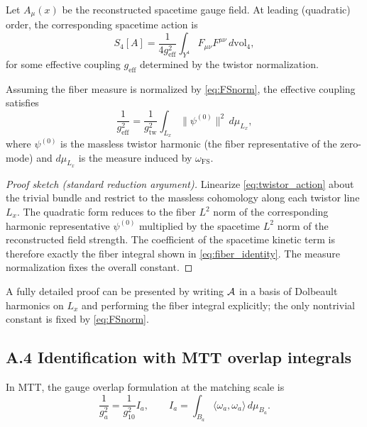 \documentclass[11pt]{article}
\begin{document}
Let $A_\mu(x)$ be the reconstructed spacetime gauge field.
At leading (quadratic) order, the corresponding spacetime action is
\begin{equation}
S_{4}[A]
=
\frac{1}{4g_{\mathrm{eff}}^2}
\int_{Y^4}
F_{\mu\nu}F^{\mu\nu}\,d\mathrm{vol}_4,
\label{eq:4d_action}
\end{equation}
for some effective coupling $g_{\mathrm{eff}}$ determined by the twistor normalization.

\begin{lemma}
Assuming the fiber measure is normalized by \eqref{eq:FSnorm},
the effective coupling satisfies
\begin{equation}
\frac{1}{g_{\mathrm{eff}}^2}
=
\frac{1}{g_{\mathrm{tw}}^2}
\int_{L_x}
\|\psi^{(0)}\|^2\, d\mu_{L_x},
\label{eq:fiber_identity}
\end{equation}
where $\psi^{(0)}$ is the massless twistor harmonic (the fiber representative of the
zero-mode) and $d\mu_{L_x}$ is the measure induced by $\omega_{\mathrm{FS}}$.
\end{lemma}

\begin{proof}[Proof sketch (standard reduction argument)]
Linearize \eqref{eq:twistor_action} about the trivial bundle and restrict to the
massless cohomology along each twistor line $L_x$.
The quadratic form reduces to the fiber $L^2$ norm of the corresponding harmonic
representative $\psi^{(0)}$ multiplied by the spacetime $L^2$ norm of the reconstructed
field strength. The coefficient of the spacetime kinetic term is therefore exactly the
fiber integral shown in \eqref{eq:fiber_identity}. The measure normalization fixes the
overall constant.
\end{proof}

\begin{remark}
A fully detailed proof can be presented by writing ${\cal A}$ in a basis of
Dolbeault harmonics on $L_x$ and performing the fiber integral explicitly;
the only nontrivial constant is fixed by \eqref{eq:FSnorm}.
\end{remark}

\subsection{A.4 Identification with MTT overlap integrals}

In MTT, the gauge overlap formulation at the matching scale is
\begin{equation}
\frac{1}{g_a^2} = \frac{1}{g_{10}^2} I_a,
\qquad
I_a = \int_{B_a}\langle\omega_a,\omega_a\rangle\, d\mu_{B_a}.
\label{eq:MTT_overlap}
\end{equation}
\end{document}
